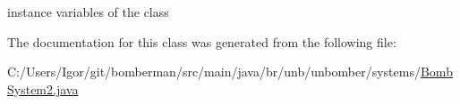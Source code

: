 instance variables of the class 



The documentation for this class was generated from the following file\+:\begin{DoxyCompactItemize}
\item 
C\+:/\+Users/\+Igor/git/bomberman/src/main/java/br/unb/unbomber/systems/\hyperlink{_bomb_system2_8java}{Bomb\+System2.\+java}\end{DoxyCompactItemize}

